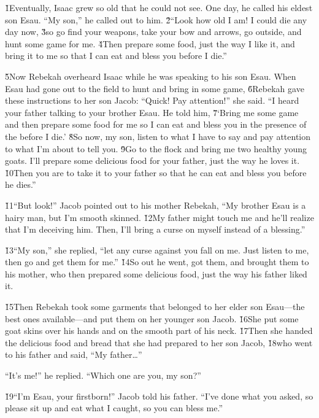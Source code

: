 \v{1}Eventually, Isaac grew so old that he could not see. One day, he called his eldest son Esau. ``My son,'' he called out to him. \v{2}``Look how old I am! I could die any day now, \v{3}so go find your weapons, take your bow and arrows, go outside, and hunt some game for me. \v{4}Then prepare some food, just the way I like it, and bring it to me so that I can eat and bless you before I die.''

\v{5}Now Rebekah overheard Isaac while he was speaking to his son Esau. When Esau had gone out to the field to hunt and bring in some game, \v{6}Rebekah gave these instructions to her son Jacob: ``Quick! Pay attention!'' she said. ``I heard your father talking to your brother Esau. He told him, \v{7}`Bring me some game and then prepare some food for me so I can eat and bless you in the presence of the  before I die.' \v{8}So now, my son, listen to what I have to say and pay attention to what I'm about to tell you. \v{9}Go to the flock and bring me two healthy young goats. I'll prepare some delicious food for your father, just the way he loves it. \v{10}Then you are to take it to your father so that he can eat and bless you before he dies.''

\v{11}``But look!'' Jacob pointed out to his mother Rebekah, ``My brother Esau is a hairy man, but I'm smooth skinned. \v{12}My father might touch me and he'll realize that I'm deceiving him. Then, I'll bring a curse on myself instead of a blessing.''

\v{13}``My son,'' she replied, ``let any curse against you fall on me. Just listen to me, then go and get them for me.'' \v{14}So out he went, got them, and brought them to his mother, who then prepared some delicious food, just the way his father liked it.

\v{15}Then Rebekah took some garments that belonged to her elder son Esau---the best ones available---and put them on her younger son Jacob. \v{16}She put some goat skins over his hands and on the smooth part of his neck. \v{17}Then she handed the delicious food and bread that she had prepared to her son Jacob, \v{18}who went to his father and said, ``My father{\ldots}''

``It's me!'' he replied. ``Which one are you, my son?''

\v{19}``I'm Esau, your firstborn!'' Jacob told his father. ``I've done what you asked, so please sit up and eat what I caught, so you can bless me.''

